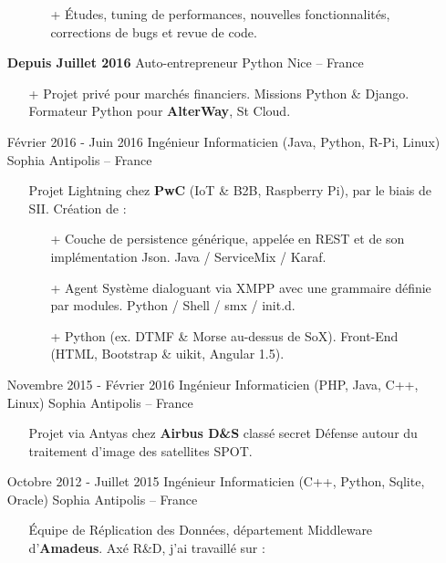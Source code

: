 \documentclass{res}
\begin{document}
\begin{resume}
\begin{itemize}
\begin{itemize}
			\begin{itemize}
				\item[+] \'Etudes, tuning de performances, nouvelles fonctionnalit\'es, corrections de bugs et revue de code.
			\end{itemize}
		\end{itemize}
		\item[] \textbf{Depuis Juillet 2016} \tabto{5cm} Auto-entrepreneur Python \hfill Nice -- France
		\begin{itemize}
			\item[+] Projet priv\'e pour march\'es financiers. Missions Python \& Django. Formateur Python pour \textbf{AlterWay}, St Cloud.
		\end{itemize}
		\item[] F\'evrier 2016 - Juin 2016 \tabto{5cm} Ing\'enieur Informaticien (Java, Python, R-Pi, Linux) \hfill Sophia Antipolis -- France
		\begin{itemize}
			\item[] Projet Lightning chez \textbf{PwC} (IoT \& B2B, Raspberry Pi), par le biais de SII. Cr\'eation de :
			\begin{itemize}
				\item[+] Couche de persistence g\'en\'erique, appel\'ee en REST et de son impl\'ementation Json. Java / ServiceMix / Karaf.
				\item[+] Agent Syst\`eme dialoguant via XMPP avec une grammaire d\'efinie par modules. Python / Shell / smx / init.d.
				\item[+] Python (ex. DTMF \& Morse au-dessus de SoX). Front-End (HTML, Bootstrap \& uikit, Angular 1.5).
			\end{itemize}
		\end{itemize}
		\item[] Novembre 2015 - F\'evrier 2016 \tabto{5cm} Ing\'enieur Informaticien (PHP, Java, C++, Linux) \hfill Sophia Antipolis -- France
		\begin{itemize}
			\item[] Projet via Antyas chez \textbf{Airbus D\&S} class\'e secret D\'efense autour du traitement d'image des satellites SPOT.
		\end{itemize}
		\item[] Octobre 2012 - Juillet 2015 \tabto{5cm} Ing\'enieur Informaticien (C++, Python, Sqlite, Oracle)  \hfill Sophia Antipolis -- France
		\begin{itemize}
			\item[] \'Equipe de R\'eplication des Donn\'ees, d\'epartement Middleware d'\textbf{Amadeus}. Ax\'e R\&D, j'ai travaill\'e sur :

\end{itemize}
\end{itemize}
\end{resume}
\end{document}
